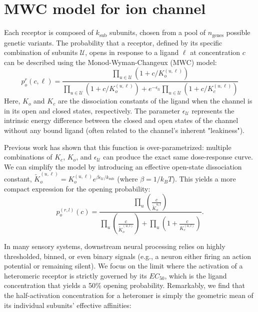 \documentclass[
    reprint, %
    amsmath,
    amssymb,
    aps,
    prb,      %
    floatfix
]{revtex4-2}
\begin{document}
\section{MWC model for ion channel}
Each receptor is composed of $k_\text{sub}$ subunits, chosen from a pool of $n_\text{genes}$ possible genetic variants. 
The probability that a receptor, defined by its specific combination of subunits $\mathcal{U}$, opens in response to a ligand $\ell$ at concentration $c$ can be described using the Monod-Wyman-Changeux (MWC) model:
\begin{equation}
p_o^r(c,\ell) = \frac{\prod_{u\in \mathcal{U}} (1+c/K_o^{(u,\ell)})}{\prod_{u\in \mathcal{U}} (1+c/K_o^{(u,\ell)}) + e^{-\epsilon_\mathcal{U}}\prod_{u\in \mathcal{U}}(1+c/K_c^{(u,\ell)})}
\end{equation}
Here, $K_o$ and $K_c$ are the dissociation constants of the ligand when the channel is in its open and closed states, respectively. The parameter $\epsilon_\mathcal{U}$ represents the intrinsic energy difference between the closed and open states of the channel without any bound ligand (often related to the channel's inherent "leakiness").


Previous work \cite{MWC} has shown that this function is over-parametrized: multiple combinations of $K_c$, $K_o$, and $\epsilon_\mathcal{U}$ can produce the exact same dose-response curve. We can simplify the model by introducing an effective open-state dissociation constant, $\tilde{K}_o^{(u,\ell)} = K_o^{(u,\ell)} e^{\beta \epsilon_\mathcal{U} / k_\text{sub}}$ (where $\beta = 1/k_BT$). This yields a more compact expression for the opening probability:
$$
p_o^{(r,l)}(c) = \frac{\prod_u \left(\frac{c}{\tilde{K}_o^{u,l}}\right)}{\prod_u\left(\frac{c}{\tilde{K}_o^{(u,l)}} \right) + \prod_u\left(1+\frac{c}{K_c^{(u,l)}} \right)}.
$$

In many sensory systems, downstream neural processing relies on highly thresholded, binned, or even binary signals (e.g., a neuron either firing an action potential or remaining silent). We focus on the limit where the activation of a heteromeric receptor is strictly governed by its $EC_{50}$, which is the ligand concentration that yields a 50\% opening probability. Remarkably, we find that the half-activation concentration for a heteromer is simply the geometric mean of its individual subunits' effective affinities:
\end{document}
